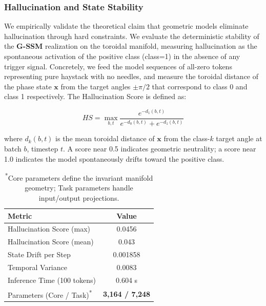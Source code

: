 \documentclass[12pt,a4paper]{article}
\begin{document}
\subsubsection{Hallucination and State Stability}
\label{sec:hallucination-experiment}

We empirically validate the theoretical claim that geometric models eliminate hallucination through hard constraints. We evaluate the deterministic stability of the \textbf{G-SSM} realization on the toroidal manifold, measuring hallucination as the spontaneous activation of the positive class (class=1) in the absence of any trigger signal. Concretely, we feed the model sequences of all-zero tokens representing pure haystack with no needles, and measure the toroidal distance of the phase state $\mathbf{x}$ from the target angles $\pm\pi/2$ that correspond to class 0 and class 1 respectively. The Hallucination Score is defined as:

\begin{equation}
HS = \max_{b,t} \frac{e^{-d_1(b,t)}}{e^{-d_0(b,t)} + e^{-d_1(b,t)}}
\end{equation}

where $d_k(b,t)$ is the mean toroidal distance of $\mathbf{x}$ from the class-$k$ target angle at batch $b$, timestep $t$. A score near 0.5 indicates geometric neutrality; a score near 1.0 indicates the model spontaneously drifts toward the positive class.

\begin{table}[htbp]
    \centering
    \caption{Hallucination and stability metrics for geometric framework.}
    \label{tab:hallucination-results}
    \begin{tabular}{lc}
        \toprule
        \textbf{Metric} & \textbf{Value} \\
        \midrule
        Hallucination Score (max) & 0.0456 \\
        Hallucination Score (mean) & 0.043 \\
        State Drift per Step & 0.001858 \\
        Temporal Variance & 0.0083 \\
        Inference Time (100 tokens) & 0.604 s \\
        Parameters (Core / Task)\textsuperscript{*} & \textbf{3,164 / 7,248} \\
        \bottomrule
    \end{tabular}
    \vspace{2pt}
    \caption*{\small \textsuperscript{*}Core parameters define the invariant manifold geometry; Task parameters handle input/output projections.}
\end{table}
\end{document}
